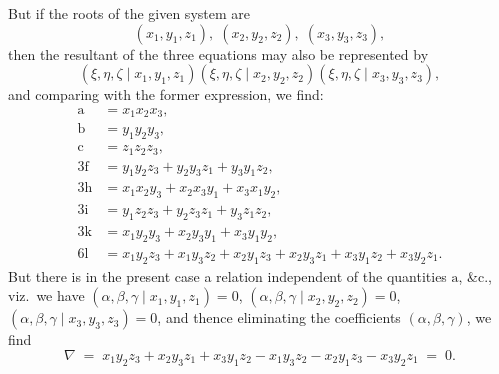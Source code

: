 \documentclass[11pt]{article}
\begin{document}
\noindent But if the roots of the given system are
\[
(x_1, y_1, z_1),\; (x_2, y_2, z_2),\; (x_3, y_3, z_3),
\]
then the resultant of the three equations may also be represented by
\[
(\xi, \eta, \zeta \mid x_1, y_1, z_1)(\xi, \eta, \zeta \mid x_2, y_2, z_2)(\xi, \eta, \zeta \mid x_3, y_3, z_3),
\]
and comparing with the former expression, we find:
\[
\begin{aligned}
\mathrm{a} &= x_1 x_2 x_3,\\
\mathrm{b} &= y_1 y_2 y_3,\\
\mathrm{c} &= z_1 z_2 z_3,\\
3\mathrm{f} &= y_1 y_2 z_3 + y_2 y_3 z_1 + y_3 y_1 z_2,\\
3\mathrm{h} &= x_1 x_2 y_3 + x_2 x_3 y_1 + x_3 x_1 y_2,\\
3\mathrm{i} &= y_1 z_2 z_3 + y_2 z_3 z_1 + y_3 z_1 z_2,\\
3\mathrm{k} &= x_1 y_2 y_3 + x_2 y_3 y_1 + x_3 y_1 y_2,\\
6\mathrm{l} &= x_1 y_2 z_3 + x_1 y_3 z_2 + x_2 y_1 z_3 + x_2 y_3 z_1 + x_3 y_1 z_2 + x_3 y_2 z_1.
\end{aligned}
\]
But there is in the present case a relation independent of the quantities $\mathrm{a}$, \&c., viz.\ we have $(\alpha, \beta, \gamma \mid x_1, y_1, z_1) = 0$, $(\alpha, \beta, \gamma \mid x_2, y_2, z_2) = 0$, $(\alpha, \beta, \gamma \mid x_3, y_3, z_3) = 0$, and thence eliminating the coefficients $(\alpha, \beta, \gamma)$, we find
\[
\nabla \;=\; x_1 y_2 z_3 + x_2 y_3 z_1 + x_3 y_1 z_2 - x_1 y_3 z_2 - x_2 y_1 z_3 - x_3 y_2 z_1 \;=\; 0.
\]

\medskip
\end{document}
